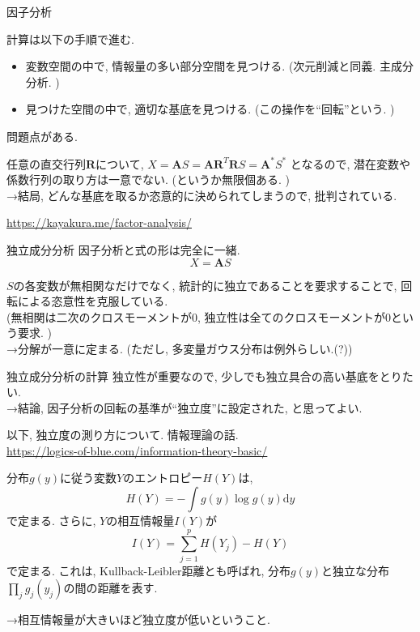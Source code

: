 \documentclass[dvipdfmx,8pt]{beamer}
\begin{document}
  \begin{frame}{因子分析}

    計算は以下の手順で進む.
    \begin{itemize}
      \item 変数空間の中で, 情報量の多い部分空間を見つける. (次元削減と同義. 主成分分析. )
      \item 見つけた空間の中で, 適切な基底を見つける. (この操作を``回転''という. )
    \end{itemize}

    問題点がある.

    任意の直交行列$\mathbf{R}$について,
    $X=\mathbf{A}S=\mathbf{A}\mathbf{R}^T\mathbf{R}S=\mathbf{A}^*S^*$
    となるので, 潜在変数や係数行列の取り方は一意でない. (というか無限個ある. )\\
    →結局, どんな基底を取るか恣意的に決められてしまうので, 批判されている.

    \url{https://kayakura.me/factor-analysis/}
  \end{frame}
  \begin{frame}{独立成分分析}
    因子分析と式の形は完全に一緒.
    \[
      X=\mathbf{A}S
    \]

    $S$の各変数が無相関なだけでなく, 統計的に独立であることを要求することで, 回転による恣意性を克服している. \\
    (無相関は二次のクロスモーメントが0, 独立性は全てのクロスモーメントが0という要求. )\\
    →分解が一意に定まる. (ただし, 多変量ガウス分布は例外らしい.(?))
  \end{frame}
  \begin{frame}{独立成分分析の計算}
    独立性が重要なので, 少しでも独立具合の高い基底をとりたい. \\
    →結論, 因子分析の回転の基準が``独立度''に設定された, と思ってよい.

    以下, 独立度の測り方について.
    情報理論の話.\\
    \url{https://logics-of-blue.com/information-theory-basic/}

    分布$g(y)$に従う変数$Y$のエントロピー$H(Y)$は,
    \[
      H(Y)=-\int g(y)\log g(y)\mathrm{d}y
    \]
    で定まる. さらに, $Y$の相互情報量$I(Y)$が
    \[
      I(Y)=\sum_{j=1}^pH(Y_j)-H(Y)
    \]
    で定まる. これは, Kullback-Leibler距離とも呼ばれ,
    分布$g(y)$と独立な分布$\prod_jg_j(y_j)$の間の距離を表す.

    →相互情報量が大きいほど独立度が低いということ.

  \end{frame}
\end{document}

